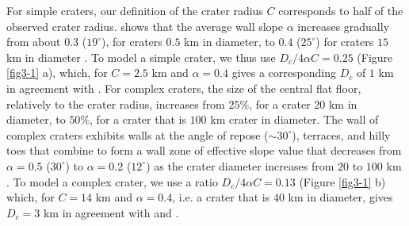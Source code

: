 \begin{article}
	For simple  craters, our definition  of the crater  radius $C$
        corresponds   to  half   of   the   observed  crater   radius.
        \citet{Pike1980} shows  that the  average wall  slope $\alpha$
        increases  gradually  from  about  $0.3$  ($19^{\circ}$),  for
        craters  $0.5$ km  in  diameter, to  $0.4$ ($25^{\circ}$)  for
        craters $15$  km in  diameter \citep{Kalynn2013a}. To  model a
        simple  crater,  we thus  use  $D_c/4\alpha  C =0.25$  (Figure
        \ref{fig3-1} a), which, for  $C=2.5$ km and $\alpha=0.4$ gives
        a   corresponding  $D_c$   of   $1$  km   in  agreement   with
        \citet{Pike1980}.   For  complex  craters,  the  size  of  the
        central flat floor, relatively to the crater radius, increases
        from $25 \%$, for a crater 20  km in diameter, to $50 \%$, for
        a crater  that is  $100$ km  crater in  diameter. The  wall of
        complex  craters  exhibits  walls   at  the  angle  of  repose
        ($\sim 30^{\circ}$), terraces, and  hilly toes that combine to
        form a wall zone of  effective slope value that decreases from
        $\alpha= 0.5$ ($30^{\circ}$) to $\alpha=0.2$ ($12^{\circ}$) as
        the  crater   diameter  increases   from  $20$  to   $100$  km
        \citep{Pike1980,BRAY2008a,Kalynn2013a}.   To  model a  complex
        crater,   we  use   a  ratio   $D_c/4\alpha  C=0.13$   (Figure
        \ref{fig3-1} b) which, for $C=14$  km and $\alpha=0.4$, i.e. a
        crater  that is  $40$  km  in diameter,  gives  $D_c=3$ km  in
        agreement with \citet{Pike1980} and \citet{Kalynn2013a}.
	 

\end{article}

